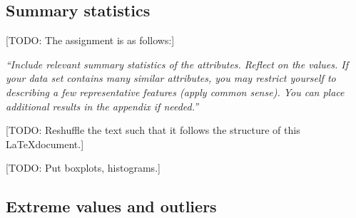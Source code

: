 \documentclass[dtu]{dtuarticle}
\newcommand{\todo}[1]{\color{red}[TODO: #1]\color{black}}
\begin{document}
	\subsection{Summary statistics}

	\todo{The assignment is as follows:}

	\textit{``Include relevant summary statistics of the attributes. Reflect on the values.
		If your data set contains many similar attributes, you may restrict yourself to describing a
		few representative features (apply common sense). You can place additional results in the
		appendix if needed.''}

	\todo{Reshuffle the text such that it follows the structure of this \LaTeX document.}

%
%


	\todo{Put boxplots, histograms.}

	\subsection{Extreme values and outliers}
\end{document}

